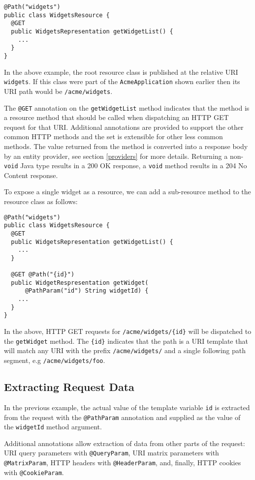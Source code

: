 \documentclass{acm_proc_article-sp}
\begin{document}
\begin{verbatim}
@Path("widgets")
public class WidgetsResource {
  @GET
  public WidgetsRepresentation getWidgetList() {
    ...
  }
}
\end{verbatim}

In the above example, the root resource class is published at the relative URI \texttt{widgets}. If this class were part of the \texttt{AcmeApplication} shown earlier then its URI path would be \texttt{/acme/widgets}.

The \texttt{@GET} annotation on the \texttt{getWidgetList} method indicates that the method is a resource method that should be called when dispatching an HTTP GET request for that URI. Additional annotations are provided to support the other common HTTP methods and the set is extensible for other less common methods. The value returned from the method is converted into a response body by an entity provider, see section \ref{providers} for more details. Returning a non-\texttt{void} Java type results in a 200 OK response, a \texttt{void} method results in a 204 No Content response.

To expose a single widget as a resource, we can add a sub-resource method to the resource class as follows:

\begin{verbatim}
@Path("widgets")
public class WidgetsResource {
  @GET
  public WidgetsRepresentation getWidgetList() {
    ...
  }
  
  @GET @Path("{id}")
  public WidgetRespresentation getWidget(
      @PathParam("id") String widgetId) {
    ...
  }
}
\end{verbatim}

In the above, HTTP GET requests for \texttt{/acme/widgets/\{id\}} will be dispatched to the \texttt{getWidget} method. The \texttt{\{id\}} indicates that the path is a URI template that will match any URI with the prefix \texttt{/acme/widgets/} and a single following path segment, e.g \texttt{/acme/widgets/foo}.

\subsection{Extracting Request Data}

In the previous example, the actual value of the template variable \texttt{id} is extracted from the request with the \texttt{@Path\-Param} annotation and supplied as the value of the \texttt{widgetId} method argument.

Additional annotations allow extraction of data from other parts of the request:
URI query parameters with \texttt{@Query\-Param}, URI matrix parameters with \texttt{@Matrix\-Param}, HTTP headers with \texttt{@Header\-Param}, and, finally, HTTP cookies with \texttt{@Cookie\-Param}.
\end{document}
